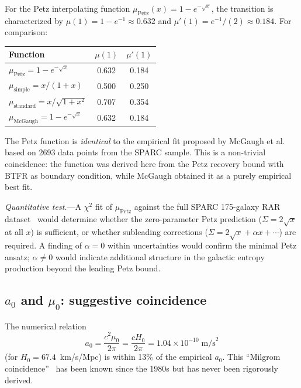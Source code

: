 \documentclass[prd,twocolumn,superscriptaddress,longbibliography,floatfix]{revtex4-2}
\begin{document}
For the Petz interpolating function $\mu_{\mathrm{Petz}}(x) = 1 - e^{-\sqrt{x}}$,
the transition is characterized by $\mu(1) = 1 - e^{-1} \approx 0.632$
and $\mu'(1) = e^{-1}/(2) \approx 0.184$.  For comparison:
\begin{center}
\begin{tabular}{lcc}
\hline
Function & $\mu(1)$ & $\mu'(1)$ \\
\hline
$\mu_{\mathrm{Petz}} = 1 - e^{-\sqrt{x}}$ & 0.632 & 0.184 \\
$\mu_{\mathrm{simple}} = x/(1+x)$ & 0.500 & 0.250 \\
$\mu_{\mathrm{standard}} = x/\sqrt{1+x^2}$ & 0.707 & 0.354 \\
$\mu_{\mathrm{McGaugh}} = 1 - e^{-\sqrt{x}}$ & 0.632 & 0.184 \\
\hline
\end{tabular}
\end{center}
The Petz function is \emph{identical} to the empirical fit
proposed by McGaugh et al.~\cite{McGaugh2016RAR} based on 2693
data points from the SPARC sample.  This is a non-trivial
coincidence: the function was derived here from the Petz
recovery bound with BTFR as boundary condition, while McGaugh
obtained it as a purely empirical best fit.

\emph{Quantitative test.}---A $\chi^2$ fit of $\mu_{\mathrm{Petz}}$
against the full SPARC 175-galaxy RAR dataset~\cite{Lelli2017}
would determine whether the zero-parameter Petz prediction
($\Sigma = 2\sqrt{x}$ at all $x$) is sufficient, or whether
subleading corrections ($\Sigma = 2\sqrt{x} + \alpha x + \cdots$)
are required.  A finding of $\alpha = 0$ within uncertainties
would confirm the minimal Petz ansatz; $\alpha \neq 0$ would
indicate additional structure in the galactic entropy production
beyond the leading Petz bound.

\subsection{$a_0$ and $\mu_0$: suggestive coincidence}
\label{sec:a0_mu}

The numerical relation
\begin{equation}
a_0 = \frac{c^2\mu_0}{2\pi} = \frac{cH_0}{2\pi}
= 1.04 \times 10^{-10}\;\mathrm{m/s}^2
\label{eq:a0_mu0}
\end{equation}
(for $H_0 = 67.4$~km/s/Mpc) is within 13\% of the empirical $a_0$.  This ``Milgrom
coincidence''~\cite{Milgrom1999} has been known since the 1980s
but has never been rigorously derived.
\end{document}
